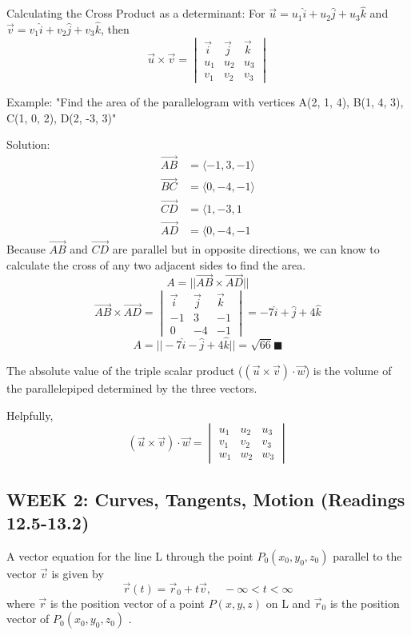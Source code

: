 \documentclass[12pt]{article}
\begin{document}
Calculating the Cross Product as a determinant:
For $\vec{u} = u_1 \hat{i} + u_2 \hat{j} + u_3 \hat{k}$ and $\vec{v} = v_1 \hat{i} + v_2 \hat{j} + v_3 \hat{k}$, then 
\[\vec{u} \times \vec{v} = \begin{vmatrix}
    \vec{i} & \vec{j} & \vec{k}\\
    u_1 & u_2 & u_3\\
    v_1 & v_2 & v_3
\end{vmatrix}\]

Example:
"Find the area of the parallelogram with vertices A(2, 1, 4), B(1, 4, 3), C(1, 0, 2), D(2, -3, 3)"

Solution:
\begin{align*}
    \vec{AB} &= \langle -1, 3, -1\rangle\\
    \vec{BC} &= \langle 0, -4, -1\rangle\\
    \vec{CD} &= \langle 1, -3, 1\\
    \vec{AD} &= \langle 0, -4, -1
\end{align*}
Because $\vec{AB}$ and $\vec{CD}$ are parallel but in opposite directions, we can know to calculate the cross of any two adjacent sides to find the area. 
\[A = ||\vec{AB} \times \vec{AD}||\]
\[ \vec{AB} \times \vec{AD} = \begin{vmatrix}
    \vec{i} & \vec{j} & \vec{k}\\
    -1 & 3 & -1\\
    0 & -4 & -1
\end{vmatrix} = -7\hat{i} + \hat{j} + 4\hat{k}\]
\[A = ||-7\hat{i} - \hat{j} + 4\hat{k}|| = \sqrt{66} \blacksquare\]

The absolute value of the triple scalar product ($(\vec{u}\times \vec{v}) \cdot \vec{w}$) is the volume of the parallelepiped determined by the three vectors.

Helpfully, 
\[(\vec{u}\times \vec{v}) \cdot \vec{w} = \begin{vmatrix}
    u_1 & u_2 & u_3\\
    v_1 & v_2 & v_3\\
    w_1 & w_2 & w_3
\end{vmatrix}\]


\subsection{WEEK 2: Curves, Tangents, Motion (Readings 12.5-13.2)}
A vector equation for the line L through the point $P_0 (x_0, y_0, z_0)$ parallel to the vector $\vec{v}$ is given by 
\[\vec{r}(t) = \vec{r}_0 + t \vec{v}, \quad -\infty < t < \infty\]
where $\vec{r}$ is the position vector of a point $P(x,y,z)$ on L and $\vec{r}_0$ is the position vector of  $P_0 (x_0, y_0, z_0)$ .
\end{document}

